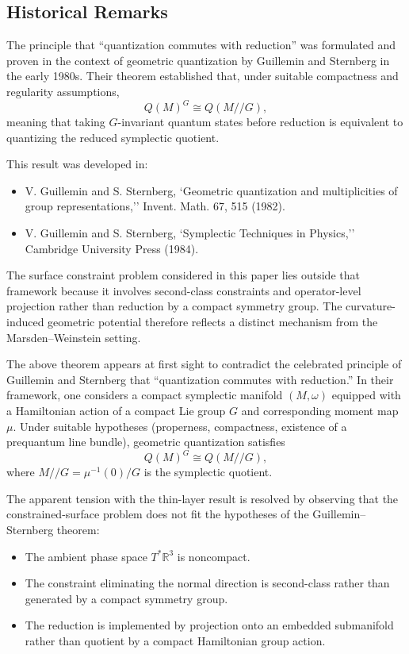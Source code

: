 \documentclass[11pt]{article}
\begin{document}
\subsection*{Historical Remarks}

The principle that ``quantization commutes with reduction'' was formulated and proven in the context of geometric quantization by Guillemin and Sternberg in the early 1980s. Their theorem established that, under suitable compactness and regularity assumptions,
\begin{equation}
Q(M)^G \cong Q(M//G),
\end{equation}
meaning that taking $G$-invariant quantum states before reduction is equivalent to quantizing the reduced symplectic quotient.

This result was developed in:
\begin{itemize}
\item V. Guillemin and S. Sternberg, `Geometric quantization and multiplicities of group representations,'' Invent. Math. 67, 515 (1982).
\item V. Guillemin and S. Sternberg, `Symplectic Techniques in Physics,'' Cambridge University Press (1984).
\end{itemize}

The surface constraint problem considered in this paper lies outside that framework because it involves second-class constraints and operator-level projection rather than reduction by a compact symmetry group. The curvature-induced geometric potential therefore reflects a distinct mechanism from the Marsden--Weinstein setting.

The above theorem appears at first sight to contradict the celebrated principle of Guillemin and Sternberg that ``quantization commutes with reduction.'' In their framework, one considers a compact symplectic manifold $(M,\omega)$ equipped with a Hamiltonian action of a compact Lie group $G$ and corresponding moment map $\mu$. Under suitable hypotheses (properness, compactness, existence of a prequantum line bundle), geometric quantization satisfies
\begin{equation}
Q(M)^G \cong Q(M//G),
\end{equation}
where $M//G = \mu^{-1}(0)/G$ is the symplectic quotient.

The apparent tension with the thin-layer result is resolved by observing that the constrained-surface problem does not fit the hypotheses of the Guillemin--Sternberg theorem:

\begin{itemize}
\item The ambient phase space $T^*\mathbb{R}^3$ is noncompact.
\item The constraint eliminating the normal direction is second-class rather than generated by a compact symmetry group.
\item The reduction is implemented by projection onto an embedded submanifold rather than quotient by a compact Hamiltonian group action.
\end{itemize}
\end{document}
